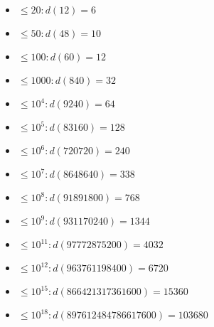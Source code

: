 \begin{itemize}
\item $\leq 20: d(12) = 6$
\item $\leq 50: d(48) = 10$
\item $\leq 100: d(60) = 12$
\item $\leq 1000: d(840) = 32$
\item $\leq 10^4: d(9 240) = 64$
\item $\leq 10^5: d(83 160) = 128$
\item $\leq 10^6: d(720 720) = 240$
\item $\leq 10^7: d(8 648 640) = 338$
\item $\leq 10^8: d(91 891 800) = 768$
\item $\leq 10^9: d(931 170 240) = 1344$
\item $\leq 10^{11}: d(97 772 875 200) = 4032$
\item $\leq 10^{12}: d(963 761 198 400) = 6720$
\item $\leq 10^{15}: d(866 421 317 361 600) = 15360$
\item $\leq 10^{18}: d(897 612 484 786 617 600) = 103680$
\end{itemize}
